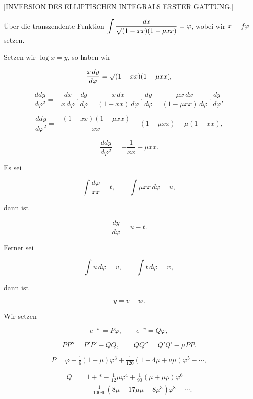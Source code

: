 \clearpage
{}%

\begin{center}
\large [INVERSION DES ELLIPTISCHEN INTEGRALS ERSTER GATTUNG.]
\end{center}

\bigskip

\noindent\hspace*{\parindent}Über die transzendente Funktion $\displaystyle\int\frac{dx}{\mathord{\surd}(1-xx)(1-\mu xx)}=\varphi$, wobei wir \mbox{$x=f\varphi$} setzen.

Setzen wir $\log x = y$, so haben wir

\[ \frac{x\,dy}{d\varphi} = \mathord{\surd}(1-xx)(1-\mu xx), \]

\[ \frac{ddy}{d\varphi^2} = -\frac{dx}{x\,d\varphi}\cdot\frac{dy}{d\varphi} - \frac{x\,dx}{(1-xx)\,d\varphi}\cdot\frac{dy}{d\varphi} - \frac{\mu x\,dx}{(1-\mu xx)\,d\varphi}\cdot\frac{dy}{d\varphi}, \]

\[ \frac{ddy}{d\varphi^2} = -\frac{(1-xx)(1-\mu xx)}{xx} - (1-\mu xx) - \mu(1-xx), \]

\[ \frac{ddy}{d\varphi^2} = -\frac{1}{xx} + \mu xx. \]

\noindent Es sei

\[ \int\frac{d\varphi}{xx} = t, \qquad \int \mu xx\,d\varphi = u, \]

\noindent dann ist

\[ \frac{dy}{d\varphi} = u - t. \]

\noindent Ferner sei

\[ \int u\,d\varphi = v, \qquad \int t\,d\varphi = w, \]

\noindent dann ist

\[ y = v - w. \]

\noindent Wir setzen

\[ e^{-w} = P\varphi, \qquad e^{-v} = Q\varphi, \]

\[ PP'' = P'P' - QQ, \qquad QQ'' = Q'Q' - \mu PP. \]

\[ P = \varphi - \tfrac{1}{6}(1+\mu)\varphi^3 + \tfrac{1}{120}(1+4\mu+\mu\mu)\varphi^5 - \cdots, \]

\[\begin{aligned} Q &= 1+\ast-\tfrac{1}{12}\mu\varphi^4+\tfrac{1}{90}(\mu+\mu\mu)\varphi^6\\&\quad-\tfrac{1}{10080}(8\mu+17\mu\mu+8\mu^3)\varphi^8-\cdots.\end{aligned}\]

\bigskip

